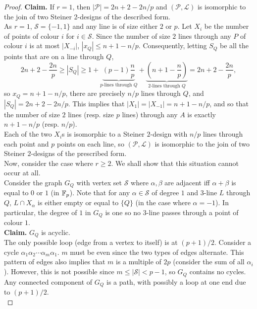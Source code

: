 \begin{proof}
		\textbf{Claim.} If $r = 1$, then $|\mathcal{P}| = 2n+2-2n/p$ and $(\mathcal{P},\mathcal{L})$ is isomorphic to the join of two Steiner 2-designs of the described form.\\
		As $r=1$, $\mathcal{S} = \{-1,1\}$ and any line is of size either $2$ or $p$. Let $X_i$ be the number of points of colour $i$ for $i \in \mathcal{S}$. Since the number of size $2$ lines through any $P$ of colour $i$ is at most $|X_{-i}|$, $|x_Q| \le n+1-n/p$. Consequently, letting $S_Q$ be all the points that are on a line through $Q$,
		\[ 2n+2-\frac{2n}{p} \ge |S_Q| \ge 1 + \underbrace{(p-1) \frac{n}{p}}_{\text{$p$-lines through $Q$}} + \underbrace{\left(n+1-\frac{n}{p}\right)}_{\text{$2$-lines through $Q$}} = 2n+2-\frac{2n}{p},  \]
		so $x_Q = n+1-n/p$, there are precisely $n/p$ lines through $Q$, and $|S_Q| = 2n+2-2n/p$. This implies that $|X_1| = |X_{-1}| = n+1-n/p$, and so that the number of size $2$ lines (resp. size $p$ lines) through any $A$ is exactly $n+1-n/p$ (resp. $n/p$).\\
		Each of the two $X_i$s is isomorphic to a Steiner $2$-design with $n/p$ lines through each point and $p$ points on each line, so $(\mathcal{P},\mathcal{L})$ is isomorphic to the join of two Steiner $2$-designs of the prescribed form. \qedwhite\\

		Now, consider the case where $r\ge2$. We shall show that this situation cannot occur at all.\\ 
		Consider the graph $G_Q$ with vertex set $\mathcal{S}$ where $\alpha,\beta$ are adjacent iff $\alpha+\beta$ is equal to $0$ or $1$ (in $\mathbb{F}_p$). Note that for any $\alpha \in \mathcal{S}$ of degree $1$ and $3$-line $L$ through $Q$, $L \cap X_\alpha$ is either empty or equal to $\{Q\}$ (in the case where $\alpha = -1$). In particular, the degree of $1$ in $G_Q$ is one so no $3$-line passes through a point of colour $1$.\\

		\textbf{Claim.} $G_Q$ is acyclic.\\
		The only possible loop (edge from a vertex to itself) is at $(p+1)/2$. Consider a cycle $\alpha_1\alpha_2\cdots\alpha_m\alpha_1$. $m$ must be even since the two types of edges alternate. This pattern of edges also implies that $m$ is a multiple of $2p$ (consider the sum of all $\alpha_i$). However, this is not possible since $m \le |\mathcal{S}| < p-1$, so $G_Q$ contains no cycles. Any connected component of $G_Q$ is a path, with possibly a loop at one end due to $(p+1)/2$. \qedwhite\\


\end{proof}
